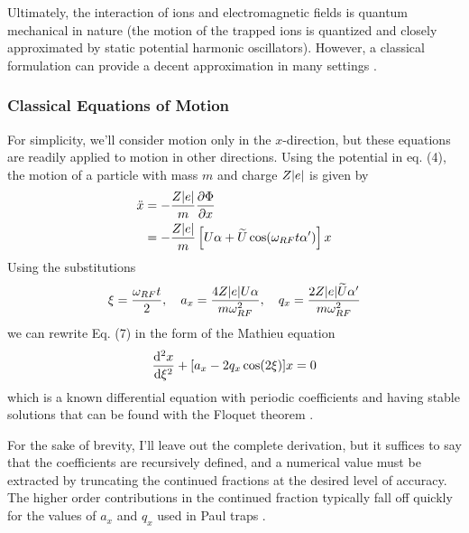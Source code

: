 Ultimately, the interaction of ions and electromagnetic fields is quantum mechanical in nature (the motion of the trapped ions is quantized and closely approximated by static potential harmonic oscillators). However, a classical formulation can provide a decent approximation in many settings \cite{Leibfried}.
\subsubsection{Classical Equations of Motion}
For simplicity, we'll consider motion only in the $x$-direction, but these equations are readily applied to motion in other directions. Using the potential in eq. (4), the motion of a particle with mass $m$ and charge $Z\abs{e}$ is given by
\begin{align}
    \ddot{x} &= -\frac{Z\abs{e}}{m} \partialderivative{\Phi}{x}\\
    \nonumber&= -\frac{Z\abs{e}}{m} \left[ U\alpha + \widetilde{U} \cos(\omega_{RF} t \alpha')\right] x
\end{align}
Using the substitutions
\begin{equation}
    \xi = \frac{\omega_{RF} t}{2}, \quad a_x = \frac{4Z\abs{e} U\alpha}{m \omega_{RF}^2}, \quad q_x = \frac{2 Z\abs{e} \widetilde{U}\alpha'}{m \omega_{RF}^2}
\end{equation}
we can rewrite Eq. (7) in the form of the Mathieu equation
\begin{equation}
    \derivative{^2 x}{\xi^2} + [a_x - 2q_x \cos(2\xi)] x = 0
\end{equation}
which is a known differential equation with periodic coefficients and having stable solutions that can be found with the Floquet theorem \cite{Leibfried}. 

For the sake of brevity, I'll leave out the complete derivation, but it suffices to say that the coefficients are recursively defined, and a numerical value must be extracted by truncating the continued fractions at the desired level of accuracy. The higher order contributions in the continued fraction typically fall off quickly for the values of $a_x$ and $q_x$ used in Paul traps \cite{Leibfried}.


